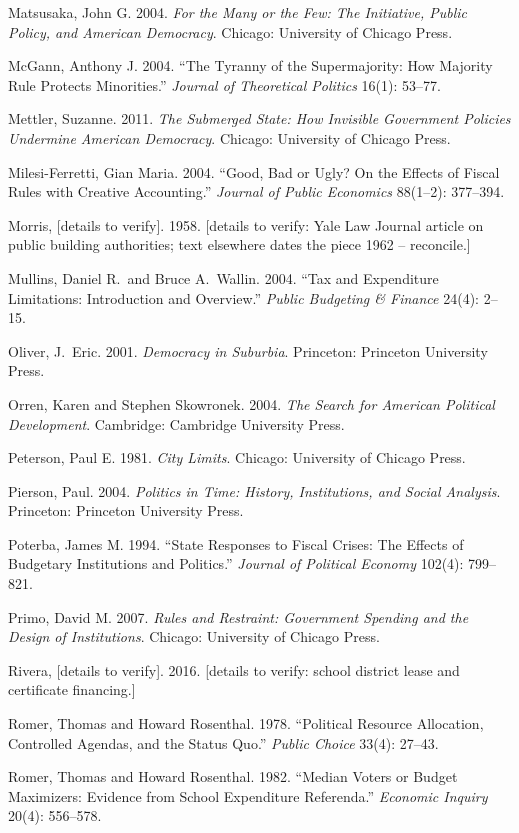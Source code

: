 Matsusaka, John G. 2004. \emph{For the Many or the Few: The Initiative, Public Policy, and American Democracy}. Chicago: University of Chicago Press.

McGann, Anthony J. 2004. ``The Tyranny of the Supermajority: How Majority Rule Protects Minorities.'' \emph{Journal of Theoretical Politics} 16(1): 53--77.

Mettler, Suzanne. 2011. \emph{The Submerged State: How Invisible Government Policies Undermine American Democracy}. Chicago: University of Chicago Press.

Milesi-Ferretti, Gian Maria. 2004. ``Good, Bad or Ugly? On the Effects of Fiscal Rules with Creative Accounting.'' \emph{Journal of Public Economics} 88(1--2): 377--394.

Morris, [details to verify]. 1958. [details to verify: Yale Law Journal article on public building authorities; text elsewhere dates the piece 1962 -- reconcile.]

Mullins, Daniel R.\ and Bruce A.\ Wallin. 2004. ``Tax and Expenditure Limitations: Introduction and Overview.'' \emph{Public Budgeting \& Finance} 24(4): 2--15.

Oliver, J.\ Eric. 2001. \emph{Democracy in Suburbia}. Princeton: Princeton University Press.

Orren, Karen and Stephen Skowronek. 2004. \emph{The Search for American Political Development}. Cambridge: Cambridge University Press.

Peterson, Paul E. 1981. \emph{City Limits}. Chicago: University of Chicago Press.

Pierson, Paul. 2004. \emph{Politics in Time: History, Institutions, and Social Analysis}. Princeton: Princeton University Press.

Poterba, James M. 1994. ``State Responses to Fiscal Crises: The Effects of Budgetary Institutions and Politics.'' \emph{Journal of Political Economy} 102(4): 799--821.

Primo, David M. 2007. \emph{Rules and Restraint: Government Spending and the Design of Institutions}. Chicago: University of Chicago Press.

Rivera, [details to verify]. 2016. [details to verify: school district lease and certificate financing.]

Romer, Thomas and Howard Rosenthal. 1978. ``Political Resource Allocation, Controlled Agendas, and the Status Quo.'' \emph{Public Choice} 33(4): 27--43.

Romer, Thomas and Howard Rosenthal. 1982. ``Median Voters or Budget Maximizers: Evidence from School Expenditure Referenda.'' \emph{Economic Inquiry} 20(4): 556--578.

